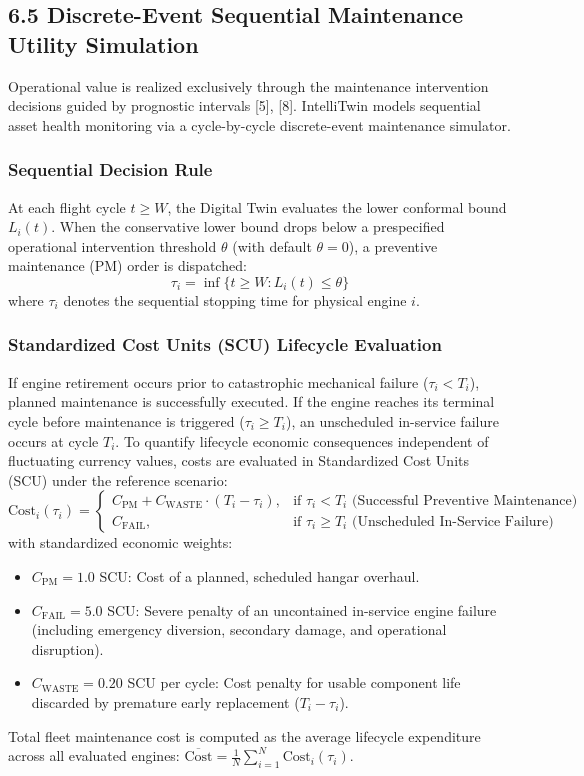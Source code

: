 \documentclass[12pt,a4paper]{article}
\begin{document}
\subsection*{6.5 Discrete-Event Sequential Maintenance Utility Simulation}
Operational value is realized exclusively through the maintenance intervention decisions guided by prognostic intervals [5], [8]. IntelliTwin models sequential asset health monitoring via a cycle-by-cycle discrete-event maintenance simulator.

\subsubsection*{Sequential Decision Rule}
At each flight cycle $t \ge W$, the Digital Twin evaluates the lower conformal bound $L_i(t)$. When the conservative lower bound drops below a prespecified operational intervention threshold $\theta$ (with default $\theta = 0$), a preventive maintenance (PM) order is dispatched:
\begin{equation}
\tau_i = \inf \{ t \ge W : L_i(t) \le \theta \}
\end{equation}
where $\tau_i$ denotes the sequential stopping time for physical engine $i$.

\subsubsection*{Standardized Cost Units (SCU) Lifecycle Evaluation}
If engine retirement occurs prior to catastrophic mechanical failure ($\tau_i < T_i$), planned maintenance is successfully executed. If the engine reaches its terminal cycle before maintenance is triggered ($\tau_i \ge T_i$), an unscheduled in-service failure occurs at cycle $T_i$. To quantify lifecycle economic consequences independent of fluctuating currency values, costs are evaluated in Standardized Cost Units (SCU) under the reference scenario:
\begin{equation}
\text{Cost}_i(\tau_i) = \begin{cases}
C_{\text{PM}} + C_{\text{WASTE}} \cdot (T_i - \tau_i), & \text{if } \tau_i < T_i \text{ (Successful Preventive Maintenance)} \\
C_{\text{FAIL}}, & \text{if } \tau_i \ge T_i \text{ (Unscheduled In-Service Failure)}
\end{cases}
\end{equation}
with standardized economic weights:
\begin{itemize}
    \item $C_{\text{PM}} = 1.0$ SCU: Cost of a planned, scheduled hangar overhaul.
    \item $C_{\text{FAIL}} = 5.0$ SCU: Severe penalty of an uncontained in-service engine failure (including emergency diversion, secondary damage, and operational disruption).
    \item $C_{\text{WASTE}} = 0.20$ SCU per cycle: Cost penalty for usable component life discarded by premature early replacement ($T_i - \tau_i$).
\end{itemize}
Total fleet maintenance cost is computed as the average lifecycle expenditure across all evaluated engines: $\overline{\text{Cost}} = \frac{1}{N} \sum_{i=1}^N \text{Cost}_i(\tau_i)$.
\end{document}
